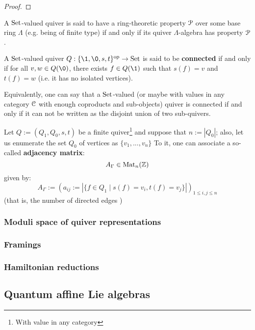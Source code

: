                \begin{proof}
                    
                \end{proof}
            \begin{convention}
                A $\mathrm{Set}$-valued quiver is said to have a ring-theoretic property $\mathcal{P}$ over some base ring $\Lambda$ (e.g. being of finite type) if and only if its quiver $\Lambda$-algebra has property $\mathcal{P}$.
            \end{convention}
            \begin{definition} \label{def: connected_quivers}
                A $\mathrm{Set}$-valued quiver $Q: \{\1, \0, s, t\}^{\op} \to \Sets$ is said to be \textbf{connected} if and only if for all $v, w \in Q(\0)$, there exists $f \in Q(\1)$ such that $s(f) = v$ and $t(f) = w$ (i.e. it has no isolated vertices).
            \end{definition}
            \begin{remark}
                Equivalently, one can say that a $\mathrm{Set}$-valued (or maybe with values in any category $\mathcal{C}$ with enough coproducts and sub-objects) quiver is connected if and only if it can not be written as the disjoint union of two sub-quivers. 
            \end{remark}
            \begin{definition} \label{def: adjacency_matrices}
                Let $Q := (Q_1, Q_0, s, t)$ be a finite quiver\footnote{With value in any category} and suppose that $n := |Q_0|$; also, let us enumerate the set $Q_0$ of vertices as $\{v_1, ..., v_n\}$ To it, one can associate a so-called \textbf{adjacency matrix}:
                    $$A_{\Gamma} \in \mathrm{Mat}_n(\mathbb{Z})$$
                given by:
                    $$A_{\Gamma} := (a_{ij} := |\{f \in Q_1 \mid s(f) = v_i, t(f) = v_j\}|)_{1 \leq i, j \leq n}$$
                (that is, the number of directed edges )
            \end{definition}
            \begin{definition} \label{def: dynkin_quivers}
                
            \end{definition}
        
        \subsubsection{Moduli space of quiver representations}
        
        \subsubsection{Framings}
        
        \subsubsection{Hamiltonian reductions}
        
    \subsection{Quantum affine Lie algebras}